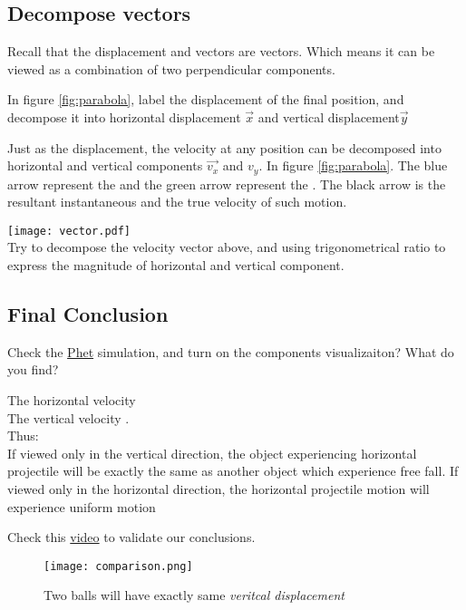 \documentclass[a4paper]{tufte-handout}
\newenvironment{TaskBox} %
{\begin{tcolorbox}[breakable,colback=b1!30,colframe=b1,title=Task]} {\end{tcolorbox}}
\newenvironment{SummBox}
{\begin{tcolorbox}[breakable,colback=r1!30,colframe=r1,title=Summary]} {\end{tcolorbox}}
\begin{document}
\subsection{Decompose vectors}
Recall that the displacement and vectors are vectors. Which means it can be viewed as a combination of two perpendicular components.
\begin{TaskBox}
In figure \ref{fig:parabola}, label the displacement of the final position, and decompose it into horizontal displacement $\vec{x}$ and vertical displacement$\vec{y}$
\end{TaskBox}

Just as the displacement, the velocity at any position can be decomposed into horizontal and vertical components $\vec{v_x}$ and $v_y$. In figure \ref{fig:parabola}. The blue arrow represent the \uline{\hspace{0.5 in}} and the green arrow represent the \uline{\hspace{0.5 in}}. The black arrow is the resultant instantaneous and the true velocity of such motion. 
\begin{TaskBox}
\texttt{[image: vector.pdf]}\\
Try to decompose the velocity vector above, and using trigonometrical ratio to express the magnitude of horizontal and vertical component.
\vspace{0.5\in}
\end{TaskBox}

\subsection{Final Conclusion}
Check the \href{https://phet.colorado.edu/sims/html/projectile-motion/latest/projectile-motion_en.html}{Phet} simulation, and turn on the components visualizaiton? What do you find?
\begin{SummBox}
The horizontal velocity \uline{\hspace{2in}}\\
The vertical velocity \uline{\hfill}.\\
Thus:\\
If viewed only in the vertical direction, the object experiencing horizontal projectile will be exactly the same as another object which experience free fall.
If viewed only in the horizontal direction, the horizontal projectile motion will experience uniform motion
\end{SummBox}

Check this \href{https://www.bilibili.com/video/BV1Bz4y167as/}{video} to validate our conclusions.
\begin{figure}[ht]
\centering
\texttt{[image: comparison.png]}
\caption{Two balls will have exactly same \emph{veritcal displacement}}
\end{figure}
\end{document}
